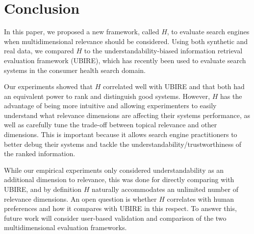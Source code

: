 
\section{Conclusion}
\label{sec:conclusion}

In this paper, we proposed a new framework, called $H$, to evaluate search engines when multidimensional relevance should be considered.
Using both synthetic and real data, we compared $H$ to the understandability-biased information retrieval evaluation framework (UBIRE), which has recently been used  to evaluate search systems in the consumer health search domain. 

Our experiments showed that $H$ correlated well with UBIRE and that both had an equivalent power to rank and distinguish good systems. However, $H$ has the advantage of being more intuitive and allowing experimenters to easily understand what relevance dimensions are affecting their systems performance, as well as carefully tune the trade-off between topical relevance and other dimensions. This is important because it allows search engine practitioners to better debug their systems and tackle the understandability/trustworthiness of the ranked information.

 While our empirical experiments only considered understandability as an additional dimension to relevance, this was done for directly comparing with UBIRE, and by definition $H$ naturally accommodates an unlimited number of relevance dimensions. An open question is whether $H$ correlates with human preferences and how it compares with UBIRE in this respect. To answer this, future work will consider user-based validation and comparison of the two multidimensional evaluation frameworks. 
